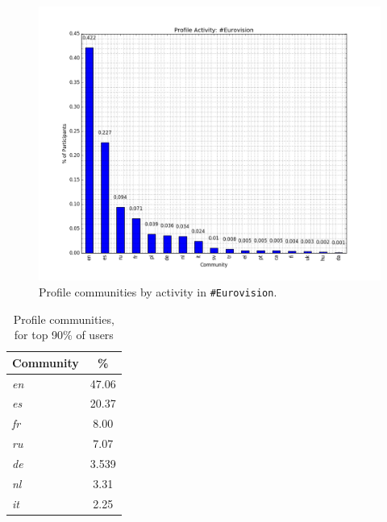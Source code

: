 \begin{figure}[htb]
\centering
\includegraphics[width=\columnwidth]{images/eurovision_profile_activity.png}
\caption{Profile communities by activity in {\texttt{\#Eurovision}}.}
\label{fig:eurovisionprofileactivity}
\end{figure}

\begin{table}[!htb]
\centering
\begin{tabular}{@{}lc}
\toprule
\textbf{Community} & \textbf{\%} \\ 
\midrule
{\emph{en}} & 47.06 \\
{\emph{es}} & 20.37 \\
{\emph{fr}} & 8.00 \\
{\emph{ru}} & 7.07 \\
{\emph{de}} & 3.539 \\
{\emph{nl}} & 3.31 \\
{\emph{it}} & 2.25 \\ 
\bottomrule
\end{tabular}
\caption{Profile communities, for top 90\% of users}
\label{tbl:profcomms}
\end{table}

